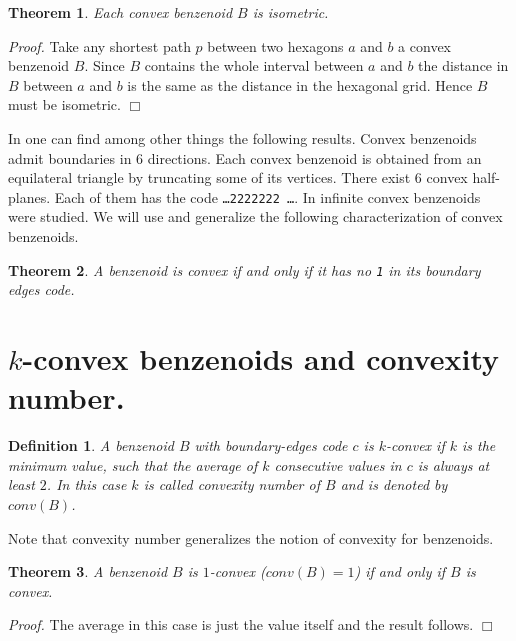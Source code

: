 \documentclass[a4paper,10pt]{article}
\newcounter{theorem}
\newtheorem{definition}{Definition}[section]
\newtheorem{theorem}{Theorem}[section]
\newenvironment{proof}{\medskip\emph{Proof.}}{\hfill$\Box$\medskip}
\begin{document}
{\begin{theorem}
Each convex benzenoid $B$ is isometric.
\end{theorem}
\begin{proof}
Take any shortest path $p$ between two hexagons $a$ and $b$ a convex benzenoid $B$. Since $B$ contains the whole interval between $a$ and $b$ the distance in $B$
between $a$ and $b$ is the same as the distance in the hexagonal grid. Hence $B$ must be isometric.
\end{proof}

In \cite{basic2017} one can find among other things the following results. Convex benzenoids admit boundaries in 6 directions.  Each convex benzenoid is obtained from an equilateral triangle by truncating some of its vertices. There exist 6 convex half-planes. Each of them has the code {\tt \ldots 2222222 \ldots}. In \cite{basic2017a} infinite convex benzenoids were studied. We will use and generalize the following characterization of convex benzenoids.

\begin{theorem}
A benzenoid is \emph{convex} if and only if it has no{ \tt 1} in its boundary edges code.
\end{theorem}

\section{$k$-convex benzenoids and convexity number.}
\begin{definition}
A benzenoid $B$ with boundary-edges code $c$ is $k$-convex if $k$ is the minimum value, such that the average of $k$ consecutive values in $c$ is always at least $2$. In this case $k$ is called \emph{convexity number} of $B$ and is denoted by $conv(B)$.
\end{definition}

Note that convexity number generalizes the notion of convexity for benzenoids.

\begin{theorem}
A benzenoid $B$ is $1$-convex ($conv(B) = 1$) if and only if $B$ is convex.
\end{theorem}

\begin{proof}
The average in this case is just the value itself and the result follows.
\end{proof}




}
\end{document}
